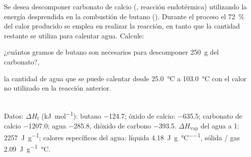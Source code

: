 Se desea descomponer carbonato de calcio (, reacción endotérmica) utilizando la energía desprendida en la combustión de butano (). Durante el proceso el \SI{72}{\percent} del calor producido se emplea en realizar la reacción, en tanto que la cantidad restante se utiliza para calentar agua. Calcule:\\[.3cm]
\begin{enumerate*}[label={\alph*)},font=\bfseries]
	\item ¿cuántos gramos de butano son necesarios para descomponer \SI{250}{\gram} del carbonato?,
	\item la cantidad de agua que se puede calentar desde \SI{25,0}{\celsius} a \SI{103,0}{\celsius} con el calor no utilizado en la reacción anterior.
\end{enumerate*}\\[.3cm]
Datos: $\Delta H_{\text{f}}$ (\si{\kilo\joule\per\mol}): butano \num{-124,7}; óxido de calcio: \num{-635,5}; carbonato de calcio \num{-1207,0}; agua \num{-285,8}, dióxido de carbono \num{-393,5}. $\Delta H_{\text{vap}}$ del agua a \SI{1}{\atm}: \SI{2257}{\joule\per\gram}; calores específicos del agua: líquida \SI{4,18}{\joule\per\gram\per\celsius}, sólida / gas \SI{2,09}{\joule\per\gram\celsius}.
